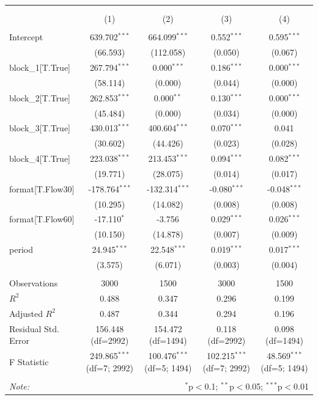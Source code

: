 \begin{table}[!htbp] \centering
\begin{tabular}{@{\extracolsep{5pt}}lcccc}
\\[-1.8ex]\hline
\hline \\[-1.8ex]
\\[-1.8ex] & (1) & (2) & (3) & (4) \\
\hline \\[-1.8ex]
 Intercept & 639.702$^{***}$ & 664.099$^{***}$ & 0.552$^{***}$ & 0.595$^{***}$ \\
& (66.593) & (112.058) & (0.050) & (0.067) \\
 block_1[T.True] & 267.794$^{***}$ & 0.000$^{***}$ & 0.186$^{***}$ & 0.000$^{***}$ \\
& (58.114) & (0.000) & (0.044) & (0.000) \\
 block_2[T.True] & 262.853$^{***}$ & 0.000$^{**}$ & 0.130$^{***}$ & 0.000$^{***}$ \\
& (45.484) & (0.000) & (0.034) & (0.000) \\
 block_3[T.True] & 430.013$^{***}$ & 400.604$^{***}$ & 0.070$^{***}$ & 0.041$^{}$ \\
& (30.602) & (44.426) & (0.023) & (0.028) \\
 block_4[T.True] & 223.038$^{***}$ & 213.453$^{***}$ & 0.094$^{***}$ & 0.082$^{***}$ \\
& (19.771) & (28.075) & (0.014) & (0.017) \\
 format[T.Flow30] & -178.764$^{***}$ & -132.314$^{***}$ & -0.080$^{***}$ & -0.048$^{***}$ \\
& (10.295) & (14.082) & (0.008) & (0.008) \\
 format[T.Flow60] & -17.110$^{*}$ & -3.756$^{}$ & 0.029$^{***}$ & 0.026$^{***}$ \\
& (10.150) & (14.878) & (0.007) & (0.009) \\
 period & 24.945$^{***}$ & 22.548$^{***}$ & 0.019$^{***}$ & 0.017$^{***}$ \\
& (3.575) & (6.071) & (0.003) & (0.004) \\
\hline \\[-1.8ex]
 Observations & 3000 & 1500 & 3000 & 1500 \\
 $R^2$ & 0.488 & 0.347 & 0.296 & 0.199 \\
 Adjusted $R^2$ & 0.487 & 0.344 & 0.294 & 0.196 \\
 Residual Std. Error & 156.448 (df=2992) & 154.472 (df=1494) & 0.118 (df=2992) & 0.098 (df=1494) \\
 F Statistic & 249.865$^{***}$ (df=7; 2992) & 100.476$^{***}$ (df=5; 1494) & 102.215$^{***}$ (df=7; 2992) & 48.569$^{***}$ (df=5; 1494) \\
\hline
\hline \\[-1.8ex]
\textit{Note:} & \multicolumn{4}{r}{$^{*}$p$<$0.1; $^{**}$p$<$0.05; $^{***}$p$<$0.01} \\
\end{tabular}
\end{table}